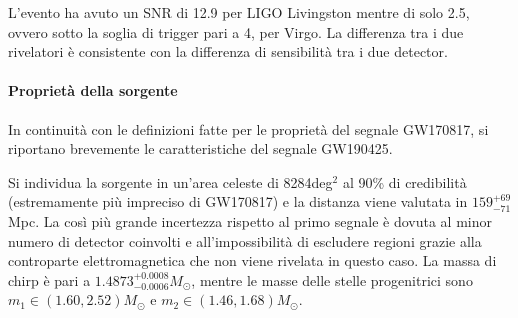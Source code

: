 L'evento ha avuto un SNR di 12.9 per LIGO Livingston mentre di solo 2.5, ovvero sotto la soglia di trigger pari a 4, per Virgo. La differenza tra i due rivelatori è consistente con la differenza di sensibilità tra i due detector\cite{Abbott_2020b}.

\paragraph{Proprietà della sorgente} In continuità con le definizioni fatte per le proprietà del segnale GW170817, si riportano brevemente le caratteristiche del segnale GW190425.

Si individua la sorgente in un'area celeste di 8284deg$^2$ al 90\% di credibilità (estremamente più impreciso di GW170817) e la distanza viene valutata in $159_{-71}^{+69}$Mpc. La così più grande incertezza rispetto al primo segnale è dovuta al minor numero di detector coinvolti e all'impossibilità di escludere regioni grazie alla controparte elettromagnetica che non viene rivelata in questo caso.
La massa di chirp è pari a $1.4873^{+0.0008}_{-0.0006}M_\odot$, mentre le masse delle stelle progenitrici sono $m_1 \in (1.60, 2.52)M_\odot$ e $m_2 \in (1.46, 1.68)M_\odot$\cite{Abbott_2020b}.

